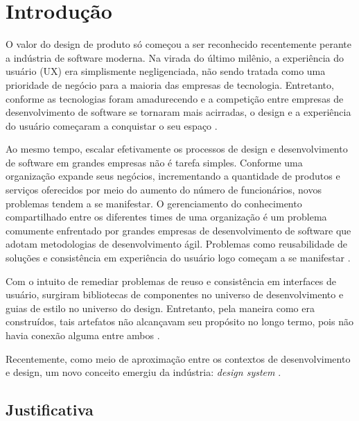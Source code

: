 
\chapter{Introdução}
\label{chap:introducao}

O valor do design de produto só começou a ser reconhecido recentemente perante a indústria de software moderna. Na virada do último milênio, a experiência do usuário (UX) era simplismente negligenciada, não sendo tratada como uma prioridade de negócio para a maioria das empresas de tecnologia. Entretanto, conforme as tecnologias foram amadurecendo e a competição entre empresas de desenvolvimento de software se tornaram mais acirradas, o design e a experiência do usuário começaram a conquistar o seu espaço \cite{ruissalo2018operating}.

Ao mesmo tempo, escalar efetivamente os processos de design e desenvolvimento de software em grandes empresas não é tarefa simples. Conforme uma organização expande seus negócios, incrementando a quantidade de produtos e serviços oferecidos por meio do aumento do número de funcionários, novos problemas tendem a se manifestar. O gerenciamento do conhecimento compartilhado entre os diferentes times de uma organização é um problema comumente enfrentado por grandes empresas de desenvolvimento de software que adotam metodologias de desenvolvimento ágil. Problemas como reusabilidade de soluções e consistência em experiência do usuário logo começam a se manifestar \cite{ruissalo2018operating}.

Com o intuito de remediar problemas de reuso e consistência em interfaces de usuário, surgiram bibliotecas de componentes no universo de desenvolvimento e guias de estilo no universo do design. Entretanto, pela maneira como era construídos, tais artefatos não alcançavam seu propósito no longo termo, pois não havia conexão alguma entre ambos \cite{ruissalo2018operating}.

Recentemente, como meio de aproximação entre os contextos de desenvolvimento e design, um novo conceito emergiu da indústria: \textit{design system} \cite{kholmatova2017design}.

\section{Justificativa}
\label{sec:justificativa}

